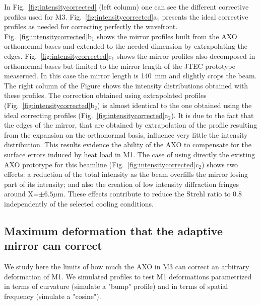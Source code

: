 \documentclass{iucr}              %
\newcommand{\inred}[1]{{\color{red}#1}}
\begin{document}
In Fig.~\ref{fig:intensitycorrected} \inred{(left column)} one can see the different corrective profiles used for M3. 
Fig.~\ref{fig:intensitycorrected}a$_1$ presents the ideal corrective profiles as needed for correcting perfectly the wavefront. Fig.~\ref{fig:intensitycorrected}b$_1$ shows the mirror profiles built from the AXO orthonormal bases and extended to the needed dimension by extrapolating the edges. Fig.~\ref{fig:intensitycorrected}c$_1$ shows the mirror profiles also decomposed in orthonormal bases but limited to the mirror length of the JTEC prototype measerued. In this case the mirror length is 140~mm and slightly crops the beam.
The right column of the Figure shows the intensity distributions obtained with these profiles.
The correction obtained using extrapolated profiles (Fig.~\ref{fig:intensitycorrected}b$_2$) is almost identical to the one obtained using the ideal correcting profiles (Fig.~\ref{fig:intensitycorrected}a$_2$). It is due to the fact that the edges of the mirror, that are obtained by extrapolation of the profile resulting from the expansion on the orthonormal basis, influence very little the intensity distribution. This results evidence the ability of the AXO to compensate for the surface errors induced by heat load in M1. The case of using directly the existing AXO prototype for this beamline (Fig.~\ref{fig:intensitycorrected}c$_2$) shows two effects: a reduction of the total intensity as the beam overfills the mirror losing part of its intensity; and also the creation of low intensity diffraction fringes around X=$\pm6.5\mu$m. These effects contribute to reduce the Strehl ratio to 0.8 independently of the selected cooling conditions.


\subsection{Maximum deformation that the adaptive mirror can correct}

We study here the limits of how much the AXO in M3 can correct an arbitrary deformation of M1. We simulated profiles to test M1 deformations parametrized in terms of curvature (simulate a "bump" profile) and in terms of spatial frequency (simulate a "cosine"). 
\end{document}
